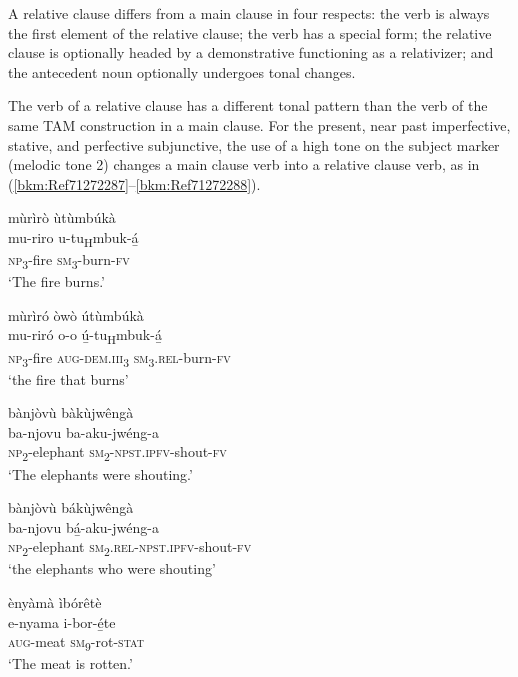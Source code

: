 A relative clause differs from a main clause in four respects: the verb is always the first element of the relative clause; the verb has a special form; the relative clause is optionally headed by a demonstrative functioning as a relativizer; and the antecedent noun optionally undergoes tonal changes.

The verb of a relative clause has a different tonal pattern than the verb of the same TAM construction in a main clause. For the present, near past imperfective, stative, and perfective subjunctive, the use of a high tone on the subject marker (melodic tone 2) changes a main clause verb into a relative clause verb, as in (\ref{bkm:Ref71272287}--\ref{bkm:Ref71272288}).

\ea
\label{bkm:Ref71272287}
\ea
mùrìrò ùtùmbúkà\\
\gll mu-riro  u-tu\textsubscript{H}mbuk-á̲\\
\textsc{np}\textsubscript{3}-fire  \textsc{sm}\textsubscript{3}-burn-\textsc{fv}\\
\glt ‘The fire burns.’

\ex
mùrìró òwò útùmbúkà\\
\gll mu-riró  o-o    ú̲-tu\textsubscript{H}mbuk-á̲\\
\textsc{np}\textsubscript{3}-fire  \textsc{aug}-\textsc{dem}.\textsc{iii}\textsubscript{3}  \textsc{sm}\textsubscript{3}.\textsc{rel}-burn-\textsc{fv}\\
\glt ‘the fire that burns’
\z\z

\ea
\ea
bànjòvù bàkùjwêngà\\
\gll ba-njovu    ba-aku-jwéng-a\\
\textsc{np}\textsubscript{2}-elephant    \textsc{sm}\textsubscript{2}-\textsc{npst}.\textsc{ipfv}-shout-\textsc{fv}\\
\glt ‘The elephants were shouting.’

\ex
bànjòvù bákùjwêngà\\
\gll ba-njovu    bá̲-aku-jwéng-a\\
\textsc{np}\textsubscript{2}-elephant    \textsc{sm}\textsubscript{2}.\textsc{rel}-\textsc{npst}.\textsc{ipfv}-shout-\textsc{fv}\\
\glt ‘the elephants who were shouting’
\z\z

\ea
\ea
ènyàmà ìbórêtè\\
\gll e-nyama  i-bor-é̲te\\
\textsc{aug}-meat  \textsc{sm}\textsubscript{9}-rot-\textsc{stat}\\
\glt ‘The meat is rotten.’


